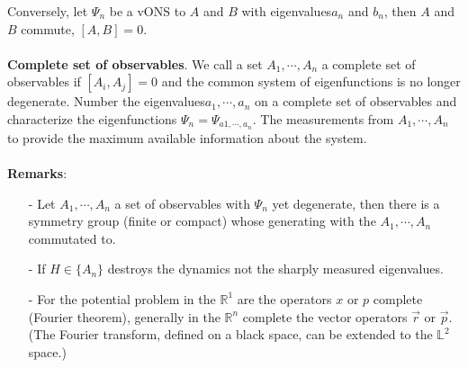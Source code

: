 Conversely, let {$\Psi_n$} be a vONS to $A$ and $B$ with eigenvalues ​​$a_n$ and $b_n$, then $A$ and $B$ commute, $[A, B] = 0$.\\\\
\textbf{Complete set of observables}. We call a set $A_1, \cdots, A_n$ a complete set of observables if $[A_i, A_j] = 0$ and the common system of eigenfunctions is no longer degenerate. Number the eigenvalues ​​$a_1, \cdots,a_n$ on a complete set of observables and characterize the eigenfunctions $Ψ_n = Ψ_{a1, \cdots,a_n}$. The measurements
from $A_1, \cdots,A_n$ to provide the maximum available information about the system.\\\\
\textbf{Remarks}: 
\begin{enumerate}
    \item[-] Let $A_1, \cdots, A_n$ a set of observables with $\Psi_n$ yet degenerate, then there is a symmetry group (finite or compact) whose
    generating with the $A_1, \cdots,A_n$ commutated to.
    \item[-]  If $H \in \{A_n\}$ destroys the dynamics not the sharply measured eigenvalues. 
    \item[-] For the potential problem in the $\mathbb{R}^1$ are the operators $x$ or $p$ complete (Fourier theorem), generally in the $\mathbb{R}^n$ complete the vector operators $\vec{r}$ or $\vec{p}$. (The Fourier transform, defined on a black space, can be extended to the $\mathbb{L}^2$ space.)
\end{enumerate}
